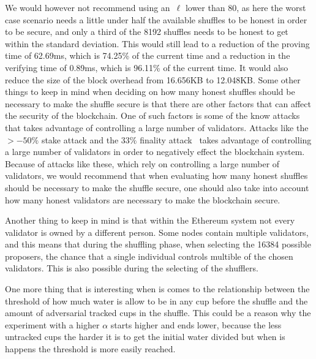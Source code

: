 We would however not recommend using an~$\ell$ lower than 80, as here the worst case scenario needs a little under half the available shuffles to be honest in order to be secure, and only a third of the 8192 shuffles needs to be honest to get within the standard deviation.
This would still lead to a reduction of the proving time of 62.69ms, which is 74.25\% of the current time and a reduction in the verifying time of 0.89ms, which is 96.11\% of the current time.
It would also reduce the size of the block overhead from 16.656KB to 12.048KB.
Some other things to keep in mind when deciding on how many honest shuffles should be necessary to make the shuffle secure is that there are other factors that can affect the security of the blockchain.
One of such factors is some of the know attacks that takes advantage of controlling a large number of validators.
Attacks like the $>-50\%$ stake attack and the $33\%$ finality attack~\cite{EthereumAttackDefense2024} takes advantage of controlling a large number of validators in order to negatively effect the blockchain system.
Because of attacks like these, which rely on controlling a large number of validators, we would recommend that when evaluating how many honest shuffles should be necessary to make the shuffle secure, one should also take into account how many honest validators are necessary to make the blockchain secure.

Another thing to keep in mind is that within the Ethereum system not every validator is owned by a different person.
Some nodes contain multiple validators, and this means that during the shuffling phase, when selecting the 16384 possible proposers, the chance that a single individual controls multible of the chosen validators.
This is also possible during the selecting of the shufflers.

One more thing that is interesting when is comes to the relationship between the threshold of how much water is allow to be in any cup before the shuffle and the amount of adversarial tracked cups in the shuffle.
This could be a reason why the experiment with a higher $\alpha$ starts higher and ends lower, because the less untracked cups the harder it is to get the initial water divided but when is happens the threshold is more easily reached.



